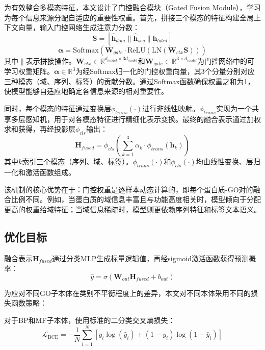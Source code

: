 为有效整合多模态特征，本文设计了门控融合模块（Gated Fusion Module），学习为每个信息来源分配自适应的重要性权重。首先，拼接三个模态的特征构建全局上下文向量，输入门控网络生成注意力分数：
\begin{equation}
    \mathbf{S} = [\hat{\mathbf{h}}_{dom} \parallel \hat{\mathbf{h}}_{seq} \parallel \mathbf{h}_{label}]
\end{equation}
\begin{equation}
    \boldsymbol{\alpha} = \text{Softmax}(\mathbf{W}_{gate} \cdot \text{ReLU}(\text{LN}(\mathbf{W}_{ctx}\mathbf{S})))
\end{equation}
其中$\parallel$表示拼接操作。$\mathbf{W}_{ctx} \in \mathbb{R}^{d_{model} \times 3d_{model}}$和$\mathbf{W}_{gate} \in \mathbb{R}^{3 \times d_{model}}$为门控网络中的可学习权重矩阵。$\boldsymbol{\alpha} \in \mathbb{R}^{3}$为经Softmax归一化的门控权重向量，其3个分量分别对应三种模态（域、序列、标签）的贡献分数。通过Softmax函数确保权重之和为1，使模型能够自适应地确定各信息来源的相对重要性。

同时，每个模态的特征通过变换层$\phi_{trans}(\cdot)$进行非线性映射。$\phi_{trans}$实现为一个共享多层感知机，用于对各模态特征进行精细化表示变换。最终的融合表示通过加权求和获得，再经投影层$\phi_{cls}$输出：
\begin{equation}
    \mathbf{H}_{fused} = \phi_{cls}\left(\sum_{k=1}^{3} \alpha_k \cdot \phi_{trans}(\mathbf{h}_k)\right)
\end{equation}
其中$k$索引三个模态（序列、域、标签）。$\phi_{trans}(\cdot)$和$\phi_{cls}(\cdot)$均由线性变换、层归一化和激活函数组成。

该机制的核心优势在于：门控权重是逐样本动态计算的，即每个蛋白质-GO对的融合比例不同。例如，当蛋白质的域信息丰富且与功能高度相关时，模型倾向于分配更高的权重给域特征；当域信息稀疏时，模型则更依赖序列特征和标签文本语义。

\subsection{优化目标}

融合表示$\mathbf{H}_{fused}$通过分类MLP生成标量逻辑值，再经sigmoid激活函数获得预测概率：
\begin{equation}
    \hat{y} = \sigma(\mathbf{W}_{out}\mathbf{H}_{fused} + b_{out})
\end{equation}

为应对不同GO子本体在类别不平衡程度上的差异，本文对不同本体采用不同的损失函数策略：

对于BP和MF子本体，使用标准的二分类交叉熵损失：
\begin{equation}
    \mathcal{L}_{\text{BCE}} = -\frac{1}{N} \sum_{i=1}^{N} \left[ y_i \log(\hat{y}_i) + (1 - y_i) \log(1 - \hat{y}_i) \right]
\end{equation}

